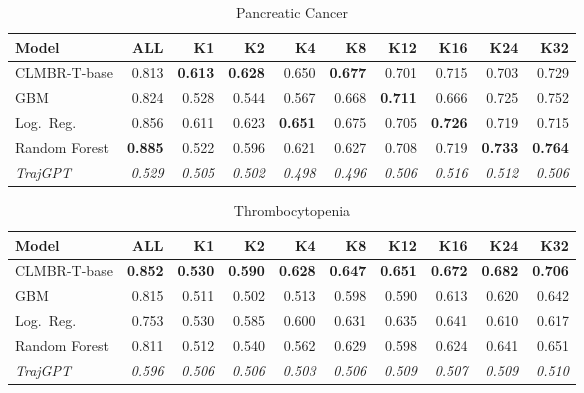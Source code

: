 \documentclass{article}
\newcommand{\B}[1]{\textbf{#1}}
\newcommand{\IT}[1]{\textit{#1}}
\begin{document}
\begin{table}[ht]
\centering\caption{Pancreatic Cancer}
\begin{tabular}{l *{9}{r}}
\toprule
\textbf{Model} & \textbf{ALL} & \textbf{K1} & \textbf{K2} & \textbf{K4} & \textbf{K8} & \textbf{K12} & \textbf{K16} & \textbf{K24} & \textbf{K32} \\
\midrule
CLMBR-T-base  & 0.813     & \B{0.613} & \B{0.628} & 0.650     & \B{0.677} & 0.701     & 0.715     & 0.703     & 0.729     \\
GBM           & 0.824     & 0.528     & 0.544     & 0.567     & 0.668     & \B{0.711} & 0.666     & 0.725     & 0.752     \\
Log.\ Reg.    & 0.856     & 0.611     & 0.623     & \B{0.651} & 0.675     & 0.705     & \B{0.726} & 0.719     & 0.715     \\
Random Forest & \B{0.885} & 0.522     & 0.596     & 0.621     & 0.627     & 0.708     & 0.719     & \B{0.733} & \B{0.764} \\
\IT{TrajGPT}  & \IT{0.529} & \IT{0.505} & \IT{0.502} & \IT{0.498} & \IT{0.496} & \IT{0.506} & \IT{0.516} & \IT{0.512} & \IT{0.506} \\
\bottomrule
\end{tabular}
\end{table}

\begin{table}[ht]
\centering\caption{Thrombocytopenia}
\begin{tabular}{l *{9}{r}}
\toprule
\textbf{Model} & \textbf{ALL} & \textbf{K1} & \textbf{K2} & \textbf{K4} & \textbf{K8} & \textbf{K12} & \textbf{K16} & \textbf{K24} & \textbf{K32} \\
\midrule
CLMBR-T-base  & \B{0.852} & \B{0.530} & \B{0.590} & \B{0.628} & \B{0.647} & \B{0.651} & \B{0.672} & \B{0.682} & \B{0.706} \\
GBM           & 0.815     & 0.511     & 0.502     & 0.513     & 0.598     & 0.590     & 0.613     & 0.620     & 0.642     \\
Log.\ Reg.    & 0.753     & 0.530     & 0.585     & 0.600     & 0.631     & 0.635     & 0.641     & 0.610     & 0.617     \\
Random Forest & 0.811     & 0.512     & 0.540     & 0.562     & 0.629     & 0.598     & 0.624     & 0.641     & 0.651     \\
\IT{TrajGPT}  & \IT{0.596} & \IT{0.506} & \IT{0.506} & \IT{0.503} & \IT{0.506} & \IT{0.509} & \IT{0.507} & \IT{0.509} & \IT{0.510} \\
\bottomrule
\end{tabular}
\end{table}
\end{document}
